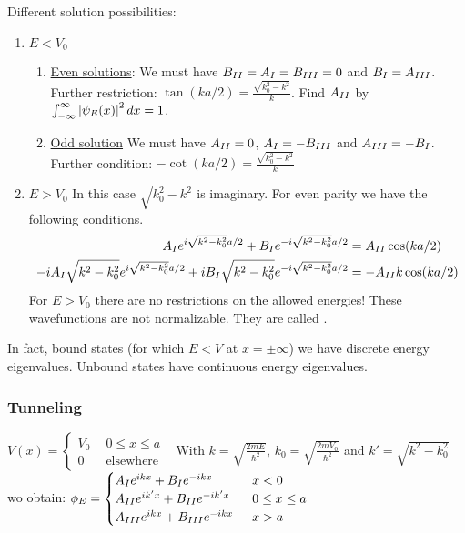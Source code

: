 Different solution possibilities:
\begin{enumerate}
    \item \underline{$E < V_0$}
        \begin{enumerate}
            \item \underline{Even solutions}:
                We must have $B_{\uproman{2}} = A_{\uproman{1}} = B_{\uproman{3}} = 0$
                and $B_{\uproman{1}} = A_{\uproman{3}}$. Further restriction:
                $\tan(k a / 2) = \frac{\sqrt{k_0^2 - k^2}}{k}$. Find $A_{\uproman{2}}$ by
                $\int_{-\infty}^\infty \left\vert \psi_E (x) \right\vert^2 dx = 1$.
            \item \underline{Odd solution}
                We must have $A_{\uproman{2}} = 0$, $A_{\uproman{1}} = - B_{\uproman{3}}$
                and $A_{\uproman{3}} = - B_{\uproman{1}}$. Further condition:
                $- \cot(k a / 2) = \frac{\sqrt{k_0^2 - k^2}}{k}$
        \end{enumerate}
    \item \underline{$E > V_0$}
        In this case $\sqrt{k_0^2 - k^2}$ is imaginary. For even parity we have the
        following conditions.
        \footnotesize
        \begin{align*}
            A_{\uproman{1}} e^{i \sqrt{k^2 - k_0^2} a / 2} + B_{\uproman{1}} e^{-i \sqrt{k^2 - k_0^2} a / 2} &= A_{\uproman{2}} \cos(k a / 2)
            \\
            -i A_{\uproman{1}} \sqrt{k^2 - k_0^2} e^{i \sqrt{k^2 - k_0^2} a / 2} + i B_{\uproman{1}} \sqrt{k^2 - k_0^2} e^{-i \sqrt{k^2 - k_0^2} a / 2} &= - A_{\uproman{2}} k \cos(k a / 2)
        \end{align*}
        \normalsize
        For $E>V_0$ there are no restrictions on the allowed energies!
        These wavefunctions are not normalizable. They are called .
\end{enumerate}
In fact, bound states (for which $E<V$ at $x = \pm \infty$) we have discrete
energy eigenvalues. Unbound states have continuous energy eigenvalues.

\subsubsection{Tunneling}
$V(x) = \begin{cases}
    V_0 \hspace{5pt} &0 \leq x \leq a \\
    0 \hspace{5pt} &\text{elsewhere}
\end{cases}$
\
With $k = \sqrt{\frac{2 m E}{\hbar^2}}$, $k_0 = \sqrt{\frac{2 m V_0}{\hbar^2}}$ and
$k' = \sqrt{k^2 - k_0^2}$ wo obtain:
$\phi_E = \begin{cases}
    A_{\uproman{1}} e^{i k x} + B_{\uproman{1}} e^{-i k x} \hspace{5pt} &x < 0
    \\
    A_{\uproman{2}} e^{i k' x} + B_{\uproman{2}} e^{-i k' x} \hspace{5pt} &0 \leq x \leq a
    \\
    A_{\uproman{3}} e^{i k x} + B_{\uproman{3}} e^{-i k x} \hspace{5pt} &x > a
\end{cases}$

